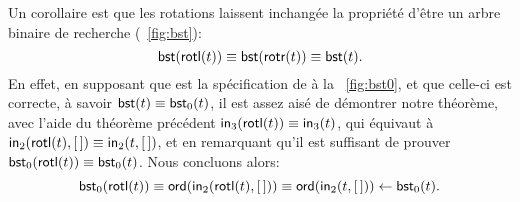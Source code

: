 Un corollaire est que les rotations laissent inchangée la propriété
d'être un arbre binaire de recherche (\fig~\vref{fig:bst}):
\begin{equation*}
\abovedisplayskip=5pt
\belowdisplayskip=5pt
\fun{bst}(\fun{rotl}(t)) \equiv \fun{bst}(\fun{rotr}(t)) \equiv \fun{bst}(t).
\end{equation*}
En effet, en supposant que  est la spécification de
 à la \fig~\vref{fig:bst0}, et que celle-ci est
correcte, à savoir \(\textsf{bst}(t) \equiv \textsf{bst}_0(t)\), il est
assez aisé de démontrer notre théorème, avec l'aide du théorème
précédent \(\textsf{in}_3(\textsf{rotl}(t)) \equiv \textsf{in}_3(t)\), qui
équivaut à \(\textsf{in}_2(\textsf{rotl}(t),[\,]) \equiv \textsf{in}_2(t,[\,])\),
et en remarquant qu'il est suffisant de prouver
\(\textsf{bst}_0(\textsf{rotl}(t)) \equiv \textsf{bst}_0(t)\). Nous concluons
alors:
\begin{equation*}
\textsf{bst}_0(\textsf{rotl}(t))
\equiv \textsf{ord}(\textsf{in}_2(\textsf{rotl}(t),[\,]))
\equiv \textsf{ord}(\textsf{in}_2(t,[\,]))
\leftarrow \textsf{bst}_0(t).
\end{equation*}

